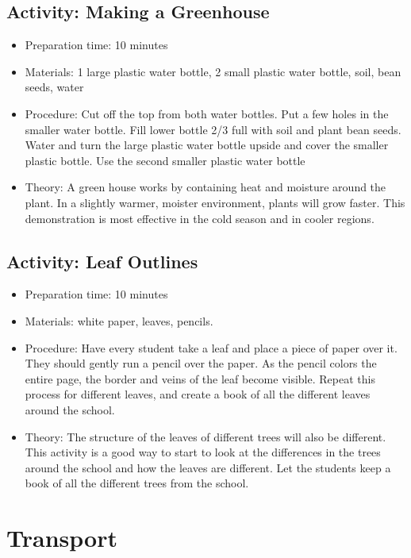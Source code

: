 \subsection{Activity: Making a Greenhouse}
\begin{itemize}
\item{Preparation time: 10 minutes}
\item{Materials: 1 large plastic water bottle, 2 small plastic water bottle, soil, bean seeds, water}
\item{Procedure: Cut off the top from both water bottles. Put a few holes in the smaller water bottle. Fill lower bottle 2/3 full with soil and plant bean seeds. Water and turn the large plastic water bottle upside and cover the smaller plastic bottle. Use the second smaller plastic water bottle}
\item{Theory: A green house works by containing heat and moisture around the plant. In a slightly warmer, moister environment, plants will grow faster. This demonstration is most effective in the cold season and in cooler regions.}
\end{itemize}

\subsection{Activity: Leaf Outlines}
\begin{itemize}
\item{Preparation time: 10 minutes}
\item{Materials: white paper, leaves, pencils.}
\item{Procedure: Have every student take a leaf and place a piece of paper over it. They should gently run a pencil over the paper. As the pencil colors the entire page, the border and veins of the leaf become visible. Repeat this process for different leaves, and create a book of all the different leaves around the school.}
\item{Theory: The structure of the leaves of different trees will also be different. This activity is a good way to start to look at the differences in the trees around the school and how the leaves are different. Let the students keep a book of all the different trees from the school.}
\end{itemize}

\section{Transport}

